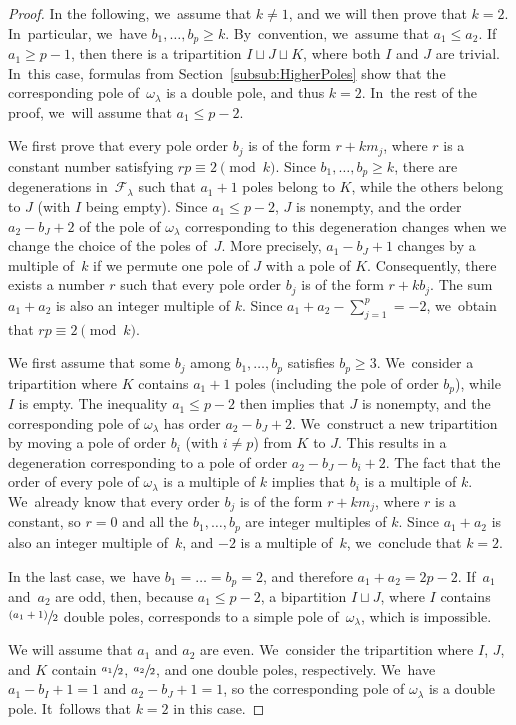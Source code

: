 \documentclass[JEP,XML,SOM,Unicode,NoFloatCountersInSection,published]{cedram}
\newcommand{\psfrac}[2]{\sfrac{(#1)}{#2}}
\theoremstyle{definition}
\begin{document}
\begin{proof}
In the following, we~assume that $k \neq 1$, and we will then prove that $k = 2$. In~particular, we~have $b_{1},\dots,b_{p} \geq k$. By~convention, we~assume that $a_{1} \leq a_{2}$. If~$a_{1} \geq p-1$, then there is a tripartition $I \sqcup J \sqcup K$, where both $I$ and $J$ are trivial. In~this case, formulas from Section~\ref{subsub:HigherPoles} show that the corresponding pole of~$\omega_{\lambda}$ is a double pole, and thus $k=2$. In~the rest of the proof, we~will assume that $a_{1} \leq p-2$.

We first prove that every pole order $b_{j}$ is of the form $r+km_{j}$, where $r$ is a constant number satisfying $rp \equiv 2\pmod{k}$. Since $b_{1},\dots,b_{p} \geq k$, there are degenerations in~$\mathcal{F}_{\lambda}$ such that $a_{1}+1$ poles belong to $K$, while the others belong to $J$ (with $I$ being empty). Since $a_{1} \leq p-2$, $J$ is nonempty, and the order $a_{2}-b_{J}+2$ of the pole of $\omega_{\lambda}$ corresponding to this degeneration changes when we change the choice of the poles of~$J$. More precisely, $a_{1}-b_{J}+1$ changes by a multiple of~$k$ if we permute one pole of $J$ with a pole of $K$. Consequently, there exists a number $r$ such that every pole order $b_{j}$ is of the form $r+kb_{j}$. The sum $a_{1}+a_{2}$ is also an integer multiple of $k$. Since $a_{1}+a_{2} - \sum_{j=1}^{p}=-2$, we~obtain that $rp \equiv 2 \pmod{k}$.

We first assume that some $b_{j}$ among $b_{1},\dots,b_{p}$ satisfies $b_{p} \geq 3$. We~consider a tripartition where $K$ contains $a_{1}+1$ poles (including the pole of order $b_{p}$), while~$I$ is empty. The inequality $a_{1} \leq p-2$ then implies that $J$ is nonempty, and the corresponding pole of $\omega_{\lambda}$ has order $a_{2}-b_{J}+2$. We~construct a new tripartition by moving a pole of order $b_{i}$ (with $i \neq p$) from $K$ to $J$. This results in a degeneration corresponding to a pole of order $a_{2}-b_{J}-b_{i}+2$. The fact that the order of every pole of $\omega_{\lambda}$ is a multiple of $k$ implies that $b_{i}$ is a multiple of $k$. We~already know that every order $b_{j}$ is of the form $r+km_{j}$, where $r$ is a constant, so $r=0$ and all the $b_{1},\dots,b_{p}$ are integer multiples of $k$. Since $a_{1}+a_{2}$ is also an integer multiple of~$k$, and $-2$ is a multiple of~$k$, we~conclude that $k=2$.

In the last case, we~have $b_{1}=\dots=b_{p}=2$, and therefore $a_{1}+a_{2}=2p-2$. If~$a_{1}$ and~$a_{2}$ are odd, then, because $a_{1} \leq p-2$, a bipartition $I \sqcup J$, where $I$ contains $\psfrac{a_{1}+1}{2}$ double poles, corresponds to a simple pole of~$\omega_{\lambda}$, which is impossible.

We will assume that $a_{1}$ and $a_{2}$ are even. We~consider the tripartition where $I$, $J$, and $K$ contain $\sfrac{a_{1}}{2}$, $\sfrac{a_{2}}{2}$, and one double poles, respectively. We~have $a_{1}-b_{I}+1=1$ and $a_{2}-b_{J}+1=1$, so the corresponding pole of $\omega_{\lambda}$ is a double pole. It~follows that $k=2$ in this case.
\end{proof}
\end{document}
